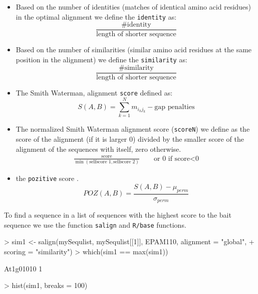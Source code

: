 \documentclass{article}
\begin{document}
\begin{itemize}
\item
Based on the number of identities (matches of identical amino acid residues) in the optimal alignment we define the \texttt{identity} as:
\begin{equation}
\frac{\textrm{\#identity}}{\textrm{length of shorter sequence}}
\end{equation}
\item 
Based on the number of similarities (similar amino acid residues at the same position in the alignment) we define the \texttt{similarity} as:
\begin{equation}
\frac{\textrm{\#similarity}}{\textrm{length of shorter sequence}}
\end{equation}

\item
The Smith Waterman, alignment \texttt{score} defined as:
\begin{equation}
S(A,B) = \sum^{N}_{k=1}{m_{{i_k}{j_k}}} - \textrm{gap penalties}
\end{equation}
\item
The normalized Smith Waterman alignment score (\texttt{scoreN}) we define as the score of the alignment (if it is larger 0) divided by the smaller score of the alignment of the sequences with itself, zero otherwise. 
\begin{eqnarray}
\frac{\textrm{score}}{\min(\textrm{selfscore 1},\textrm{selfscore 2})} \qquad \textrm{or 0 if score<0}
\end{eqnarray}

\item the \texttt{pozitive} score \cite{Booth}.
\begin{equation}
  POZ(A,B)=\frac{S(A,B)-\mu_{perm}}{\sigma_{perm}}
\end{equation}
\end{itemize}

To find a sequence in a list of sequences with the highest score to the bait sequence we use the function \texttt{salign} and \texttt{R/base} functions.

\begin{Schunk}
\begin{Sinput}
> sim1 <- salign(mySequlist, mySequlist[[1]], EPAM110, alignment = "global", 
+     scoring = "similarity")
> which(sim1 == max(sim1))
\end{Sinput}
\begin{Soutput}
At1g01010 
        1 
\end{Soutput}
\begin{Sinput}
> hist(sim1, breaks = 100)
\end{Sinput}
\end{Schunk}
\end{document}
